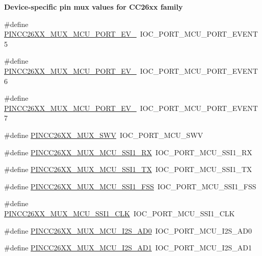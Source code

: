 \begin{Indent}{\bf Device-\/specific pin mux values for C\+C26xx family}
\begin{DoxyCompactItemize}
\#define \hyperlink{_p_i_n_c_c26_x_x_8h_ac40077324ac80180a49465d1885a2fe7}{P\+I\+N\+C\+C26\+X\+X\+\_\+\+M\+U\+X\+\_\+\+M\+C\+U\+\_\+\+P\+O\+R\+T\+\_\+\+E\+V\+\_}~I\+O\+C\+\_\+\+P\+O\+R\+T\+\_\+\+M\+C\+U\+\_\+\+P\+O\+R\+T\+\_\+\+E\+V\+E\+N\+T5
\item 
\#define \hyperlink{_p_i_n_c_c26_x_x_8h_aa678108d3aa67fdd656d55778c48d732}{P\+I\+N\+C\+C26\+X\+X\+\_\+\+M\+U\+X\+\_\+\+M\+C\+U\+\_\+\+P\+O\+R\+T\+\_\+\+E\+V\+\_}~I\+O\+C\+\_\+\+P\+O\+R\+T\+\_\+\+M\+C\+U\+\_\+\+P\+O\+R\+T\+\_\+\+E\+V\+E\+N\+T6
\item 
\#define \hyperlink{_p_i_n_c_c26_x_x_8h_ac786e2de45a697ba3a50fd354385b1bf}{P\+I\+N\+C\+C26\+X\+X\+\_\+\+M\+U\+X\+\_\+\+M\+C\+U\+\_\+\+P\+O\+R\+T\+\_\+\+E\+V\+\_}~I\+O\+C\+\_\+\+P\+O\+R\+T\+\_\+\+M\+C\+U\+\_\+\+P\+O\+R\+T\+\_\+\+E\+V\+E\+N\+T7
\item 
\#define \hyperlink{_p_i_n_c_c26_x_x_8h_a41d5905977a5fb86dc4aa7addeaecaa3}{P\+I\+N\+C\+C26\+X\+X\+\_\+\+M\+U\+X\+\_\+\+S\+W\+V}~I\+O\+C\+\_\+\+P\+O\+R\+T\+\_\+\+M\+C\+U\+\_\+\+S\+W\+V
\item 
\#define \hyperlink{_p_i_n_c_c26_x_x_8h_ac3d873c9fc963e7abdd88ac92a2efb97}{P\+I\+N\+C\+C26\+X\+X\+\_\+\+M\+U\+X\+\_\+\+M\+C\+U\+\_\+\+S\+S\+I1\+\_\+\+R\+X}~I\+O\+C\+\_\+\+P\+O\+R\+T\+\_\+\+M\+C\+U\+\_\+\+S\+S\+I1\+\_\+\+R\+X
\item 
\#define \hyperlink{_p_i_n_c_c26_x_x_8h_a6843ba0b056b1b2a7ee3b6471da4e6a1}{P\+I\+N\+C\+C26\+X\+X\+\_\+\+M\+U\+X\+\_\+\+M\+C\+U\+\_\+\+S\+S\+I1\+\_\+\+T\+X}~I\+O\+C\+\_\+\+P\+O\+R\+T\+\_\+\+M\+C\+U\+\_\+\+S\+S\+I1\+\_\+\+T\+X
\item 
\#define \hyperlink{_p_i_n_c_c26_x_x_8h_aef46bbee91ef9b7786e7ff242ebc9383}{P\+I\+N\+C\+C26\+X\+X\+\_\+\+M\+U\+X\+\_\+\+M\+C\+U\+\_\+\+S\+S\+I1\+\_\+\+F\+S\+S}~I\+O\+C\+\_\+\+P\+O\+R\+T\+\_\+\+M\+C\+U\+\_\+\+S\+S\+I1\+\_\+\+F\+S\+S
\item 
\#define \hyperlink{_p_i_n_c_c26_x_x_8h_a9625d595a8b69fa6e5405741818e1bda}{P\+I\+N\+C\+C26\+X\+X\+\_\+\+M\+U\+X\+\_\+\+M\+C\+U\+\_\+\+S\+S\+I1\+\_\+\+C\+L\+K}~I\+O\+C\+\_\+\+P\+O\+R\+T\+\_\+\+M\+C\+U\+\_\+\+S\+S\+I1\+\_\+\+C\+L\+K
\item 
\#define \hyperlink{_p_i_n_c_c26_x_x_8h_ab4fda137377a46f157d7d1ec55339dc7}{P\+I\+N\+C\+C26\+X\+X\+\_\+\+M\+U\+X\+\_\+\+M\+C\+U\+\_\+\+I2\+S\+\_\+\+A\+D0}~I\+O\+C\+\_\+\+P\+O\+R\+T\+\_\+\+M\+C\+U\+\_\+\+I2\+S\+\_\+\+A\+D0
\item 
\#define \hyperlink{_p_i_n_c_c26_x_x_8h_a3d04198ab5bfdd7a50d113833bf64bc9}{P\+I\+N\+C\+C26\+X\+X\+\_\+\+M\+U\+X\+\_\+\+M\+C\+U\+\_\+\+I2\+S\+\_\+\+A\+D1}~I\+O\+C\+\_\+\+P\+O\+R\+T\+\_\+\+M\+C\+U\+\_\+\+I2\+S\+\_\+\+A\+D1

\end{DoxyCompactItemize}
\end{Indent}
